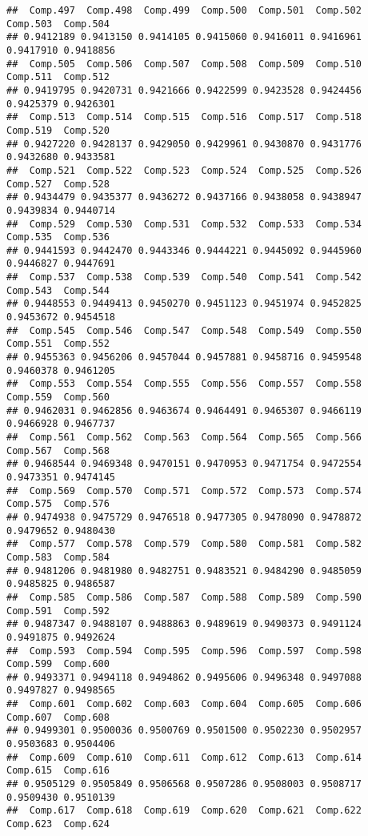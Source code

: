 \documentclass[
]{article}
\begin{document}
\begin{verbatim}
##  Comp.497  Comp.498  Comp.499  Comp.500  Comp.501  Comp.502  Comp.503  Comp.504 
## 0.9412189 0.9413150 0.9414105 0.9415060 0.9416011 0.9416961 0.9417910 0.9418856 
##  Comp.505  Comp.506  Comp.507  Comp.508  Comp.509  Comp.510  Comp.511  Comp.512 
## 0.9419795 0.9420731 0.9421666 0.9422599 0.9423528 0.9424456 0.9425379 0.9426301 
##  Comp.513  Comp.514  Comp.515  Comp.516  Comp.517  Comp.518  Comp.519  Comp.520 
## 0.9427220 0.9428137 0.9429050 0.9429961 0.9430870 0.9431776 0.9432680 0.9433581 
##  Comp.521  Comp.522  Comp.523  Comp.524  Comp.525  Comp.526  Comp.527  Comp.528 
## 0.9434479 0.9435377 0.9436272 0.9437166 0.9438058 0.9438947 0.9439834 0.9440714 
##  Comp.529  Comp.530  Comp.531  Comp.532  Comp.533  Comp.534  Comp.535  Comp.536 
## 0.9441593 0.9442470 0.9443346 0.9444221 0.9445092 0.9445960 0.9446827 0.9447691 
##  Comp.537  Comp.538  Comp.539  Comp.540  Comp.541  Comp.542  Comp.543  Comp.544 
## 0.9448553 0.9449413 0.9450270 0.9451123 0.9451974 0.9452825 0.9453672 0.9454518 
##  Comp.545  Comp.546  Comp.547  Comp.548  Comp.549  Comp.550  Comp.551  Comp.552 
## 0.9455363 0.9456206 0.9457044 0.9457881 0.9458716 0.9459548 0.9460378 0.9461205 
##  Comp.553  Comp.554  Comp.555  Comp.556  Comp.557  Comp.558  Comp.559  Comp.560 
## 0.9462031 0.9462856 0.9463674 0.9464491 0.9465307 0.9466119 0.9466928 0.9467737 
##  Comp.561  Comp.562  Comp.563  Comp.564  Comp.565  Comp.566  Comp.567  Comp.568 
## 0.9468544 0.9469348 0.9470151 0.9470953 0.9471754 0.9472554 0.9473351 0.9474145 
##  Comp.569  Comp.570  Comp.571  Comp.572  Comp.573  Comp.574  Comp.575  Comp.576 
## 0.9474938 0.9475729 0.9476518 0.9477305 0.9478090 0.9478872 0.9479652 0.9480430 
##  Comp.577  Comp.578  Comp.579  Comp.580  Comp.581  Comp.582  Comp.583  Comp.584 
## 0.9481206 0.9481980 0.9482751 0.9483521 0.9484290 0.9485059 0.9485825 0.9486587 
##  Comp.585  Comp.586  Comp.587  Comp.588  Comp.589  Comp.590  Comp.591  Comp.592 
## 0.9487347 0.9488107 0.9488863 0.9489619 0.9490373 0.9491124 0.9491875 0.9492624 
##  Comp.593  Comp.594  Comp.595  Comp.596  Comp.597  Comp.598  Comp.599  Comp.600 
## 0.9493371 0.9494118 0.9494862 0.9495606 0.9496348 0.9497088 0.9497827 0.9498565 
##  Comp.601  Comp.602  Comp.603  Comp.604  Comp.605  Comp.606  Comp.607  Comp.608 
## 0.9499301 0.9500036 0.9500769 0.9501500 0.9502230 0.9502957 0.9503683 0.9504406 
##  Comp.609  Comp.610  Comp.611  Comp.612  Comp.613  Comp.614  Comp.615  Comp.616 
## 0.9505129 0.9505849 0.9506568 0.9507286 0.9508003 0.9508717 0.9509430 0.9510139 
##  Comp.617  Comp.618  Comp.619  Comp.620  Comp.621  Comp.622  Comp.623  Comp.624 

\end{verbatim}
\end{document}
